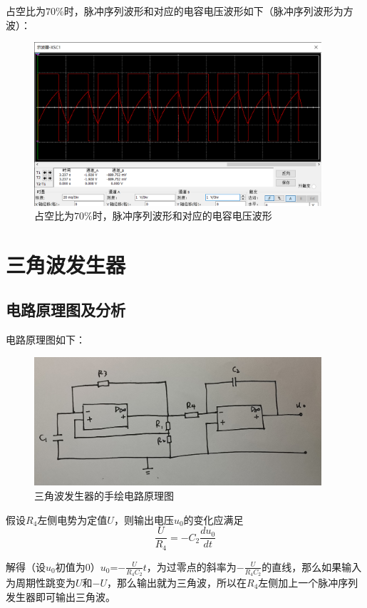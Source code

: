 \documentclass[UTF8]{ctexart}
\begin{document}
占空比为$70\%$时，脉冲序列波形和对应的电容电压波形如下（脉冲序列波形为方波）：
\begin{figure}[H]
\centering
\includegraphics[width=0.95\textwidth]{DD.png}
\caption{占空比为$70\%$时，脉冲序列波形和对应的电容电压波形}
\end{figure}

\section{三角波发生器}
\subsection{电路原理图及分析}
电路原理图如下：
\begin{figure}[H]
\centering
\includegraphics[width=0.95\textwidth]{G.jpg}
\caption{三角波发生器的手绘电路原理图}
\end{figure}

假设$R_4$左侧电势为定值$U$，则输出电压$u_0$的变化应满足
\begin{equation}
\frac{U}{R_4}=-C_2\frac{du_0}{dt}
\end{equation}

解得（设$u_0$初值为0）$u_0$=$-\frac{U}{R_4C_2}t$，为过零点的斜率为$-\frac{U}{R_4C_2}$的直线，那么如果输入为周期性跳变为$U$和$-U$，那么输出就为三角波，所以在$R_4$左侧加上一个脉冲序列发生器即可输出三角波。
\end{document}
